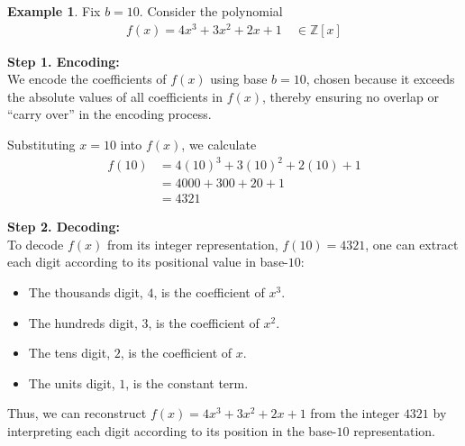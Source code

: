 \documentclass[12pt,reqno]{article}
\theoremstyle{plain}
\theoremstyle{definition}
\newtheorem{example}{Example}
\begin{document}
\begin{example}
Fix $b=10$. Consider the polynomial 
\begin{align*}
    f(x) = 4x^3 + 3x^2 + 2x + 1 \quad \in \mathbb{Z}[x]
\end{align*}

\textbf{Step 1. Encoding:} \\
We encode the coefficients of $f(x)$ using base $b=10$, chosen because it exceeds the absolute values of all coefficients in $f(x)$, thereby ensuring no overlap or ``carry over'' in the encoding process.

Substituting $x = 10$ into $f(x)$, we calculate
\begin{align*}
    f(10) &= 4(10)^3 + 3(10)^2 + 2(10) + 1 \\
    &= 4000 + 300 + 20 + 1 \\
    &= 4321
\end{align*}

\textbf{Step 2. Decoding:} \\
To decode $f(x)$ from its integer representation, $f(10) = 4321$, one can extract each digit according to its positional value in base-$10$:

\begin{itemize}
    \item The thousands digit, $4$, is the coefficient of $x^3$.
    \item The hundreds digit, $3$, is the coefficient of $x^2$.
    \item The tens digit, $2$, is the coefficient of $x$.
    \item The units digit, $1$, is the constant term.
\end{itemize}

Thus, we can reconstruct $f(x) = 4x^3 + 3x^2 + 2x + 1$ from the integer $4321$ by interpreting each digit according to its position in the base-$10$ representation.
\end{example}

\begingroup
\raggedright


\endgroup
\end{document}
